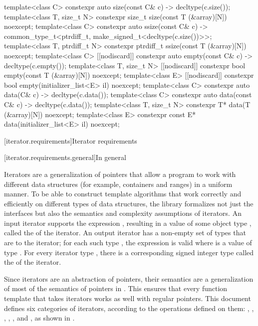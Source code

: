 \begin{codeblock}
{  template<class C> constexpr auto size(const C& c) -> decltype(c.size());
  template<class T, size_t N> constexpr size_t size(const T (&array)[N]) noexcept;
  template<class C> constexpr auto ssize(const C& c)
    -> common_type_t<ptrdiff_t, make_signed_t<decltype(c.size())>>;
  template<class T, ptrdiff_t N> constexpr ptrdiff_t ssize(const T (&array)[N]) noexcept;
  template<class C> [[nodiscard]] constexpr auto empty(const C& c) -> decltype(c.empty());
  template<class T, size_t N> [[nodiscard]] constexpr bool empty(const T (&array)[N]) noexcept;
  template<class E> [[nodiscard]] constexpr bool empty(initializer_list<E> il) noexcept;
  template<class C> constexpr auto data(C& c) -> decltype(c.data());
  template<class C> constexpr auto data(const C& c) -> decltype(c.data());
  template<class T, size_t N> constexpr T* data(T (&array)[N]) noexcept;
  template<class E> constexpr const E* data(initializer_list<E> il) noexcept;
}
\end{codeblock}

[iterator.requirements]{Iterator requirements}

[iterator.requirements.general]{In general}

\pnum
{}%
Iterators are a generalization of pointers that allow a \Cpp{} program to work with different data structures
(for example, containers and ranges) in a uniform manner.
To be able to construct template algorithms that work correctly and
efficiently on different types of data structures, the library formalizes not just the interfaces but also the
semantics and complexity assumptions of iterators.
An input iterator
supports the expression
,
resulting in a value of some object type
,
called the
of the iterator.
An output iterator  has a non-empty set of types that are
 to the iterator;
for each such type , the expression 
is valid where  is a value of type .
For every iterator type
,
there is a corresponding signed integer type called the
of the iterator.

\pnum
Since iterators are an abstraction of pointers, their semantics are
a generalization of most of the semantics of pointers in \Cpp{}.
This ensures that every
function template
that takes iterators
works as well with regular pointers.
This document defines
six categories of iterators, according to the operations
defined on them:
,
,
,
,
,
and
,
as shown in .

